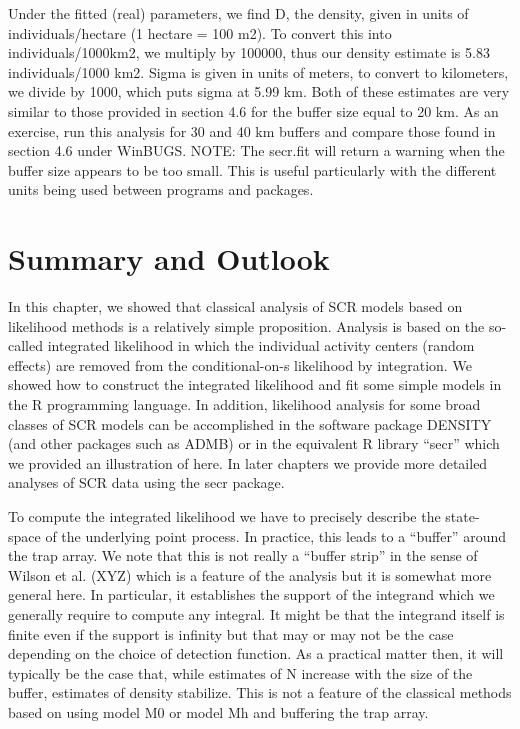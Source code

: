 Under the fitted (real) parameters, we find D, the density, given in
units of individuals/hectare (1 hectare = 100 m2).  To convert this
into individuals/1000km2, we multiply by 100000, thus our density
estimate is 5.83 individuals/1000 km2.  Sigma is given in units of
meters, to convert to kilometers, we divide by 1000, which puts sigma
at 5.99 km.  Both of these estimates are very similar to those
provided in section 4.6 for the buffer size equal to 20 km.  As an
exercise, run this analysis for 30 and 40 km buffers and compare those
found in section 4.6 under WinBUGS.  NOTE: The secr.fit will return a
warning when the buffer size appears to be too small.  This is useful
particularly with the different units being used between programs and
packages.



\section{Summary and Outlook}

In this chapter, we showed that classical analysis of SCR models based
on likelihood methods is a relatively simple proposition.  Analysis is
based on the so-called integrated likelihood in which the individual
activity centers (random effects) are removed from the
conditional-on-s likelihood by integration. We showed how to construct
the integrated likelihood and fit some simple models in the R
programming language.  In addition, likelihood analysis for some broad
classes of SCR models can be accomplished in the software package
DENSITY (and other packages such as ADMB) or in the equivalent R
library “secr” which we provided an illustration of here. In later
chapters we provide more detailed analyses of SCR data using the secr
package.

To compute the integrated likelihood we have to precisely describe the
state-space of the underlying point process. In practice, this leads
to a “buffer” around the trap array. We note that this is not really a
“buffer strip” in the sense of Wilson et al. (XYZ) which is a feature
of the analysis but it is somewhat more general here. In particular,
it establishes the support of the integrand which we generally require
to compute any integral. It might be that the integrand itself is
finite even if the support is infinity but that may or may not be the
case depending on the choice of detection function. As a practical
matter then, it will typically be the case that, while estimates of N
increase with the size of the buffer, estimates of density
stabilize. This is not a feature of the classical methods based on
using model M0 or model Mh and buffering the trap array.

